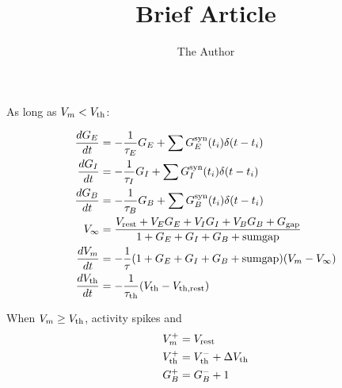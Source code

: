 \documentclass[12pt]{amsart}
\title{Brief Article}
\author{The Author}
\begin{document}

\noindent As long as $V_m < V_{\scriptstyle{\rm th}}$:

\begin{align*}
\frac{dG_E}{dt} &= -\dfrac{1}{\tau_E} G_E + \sum G_E^{\scriptstyle{\rm syn}}(t_i)\delta(t-t_i)\\
\frac{dG_I}{dt} &= -\dfrac{1}{\tau_I} G_I + \sum G_I^{\scriptstyle{\rm syn}}(t_i)\delta(t-t_i)\\
\frac{dG_B}{dt} &= -\dfrac{1}{\tau_B} G_B + \sum G_B^{\scriptstyle{\rm syn}}(t_i)\delta(t-t_i)\\
V_\infty &= \dfrac{V_{\scriptstyle{\rm rest}} + V_E G_E + V_I G_I + V_B G_B + G_{\scriptstyle{\rm gap}}}{1+G_E+G_I+G_B+\text{sumgap}}\\
\frac{dV_m}{dt} &= -\dfrac{1}{\tau}(1+G_E+G_I+G_B+\text{sumgap})(V_m-V_\infty)\\
\frac{dV_{\scriptstyle{\rm th}}}{dt} &= -\dfrac{1}{\tau_{\scriptstyle{\rm th}}}(V_{\scriptstyle{\rm th}}-V_{\scriptstyle{\rm th,rest}})
\\
\end{align*}

\noindent When $V_m\ge V_{\scriptstyle{\rm th}}$, activity spikes and
\begin{align*}
V_m^+ &= V_{\scriptstyle{\rm rest}}\\
V_{\scriptstyle{\rm th}}^+ &= V_{\scriptstyle{\rm th}}^- + \Delta V_{\scriptstyle{\rm th}}\\
G_B^+ &= G_B^- + 1
\end{align*}
\end{document}
